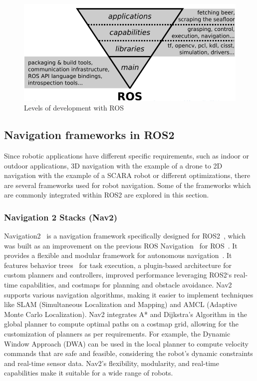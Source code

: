 \vspace{1.0em}
\begin{figure}[H]
    \centering
    \includegraphics[width=4.8in ]{pics/ree.png}
    \caption[Levels of development with ROS]{Levels of development with ROS~\cite{mosenlechner2012ros}}\label{lt_4}
\end{figure}


\newpage

\subsection{Navigation frameworks in ROS2}
Since robotic applications have different specific requirements, such as indoor or outdoor applications, 3D navigation
with the example of a drone to 2D navigation with the example of a SCARA robot or different optimizations, there are
several frameworks used for robot navigation. Some of the frameworks which are commonly integrated within ROS2 are
explored in this section. 

\subsubsection{Navigation 2 Stacks (Nav2)}
Navigation2~\cite{thomas2014nextgenros}\cite{macenski2020marathon2} is a navigation framework specifically designed for ROS2~\cite{thomas2014nextgenros}, which was built as an improvement on
the previous ROS Navigation~\cite{quigley2009ros} for ROS~\cite{mardereppstein2010office}. It provides a flexible and modular framework for autonomous
navigation~\cite{macenski2020marathon2}. It features behavior trees~\cite{abiyev2016robot} for task execution, a plugin-based architecture
for custom planners and controllers, improved performance leveraging ROS2`s real-time capabilities, and 
costmaps for planning and obstacle avoidance. Nav2 supports various navigation algorithms, making it easier to implement 
techniques like SLAM (Simultaneous Localization and Mapping) and AMCL (Adaptive Monte Carlo Localization). Nav2 
integrates A* and Dijkstra's Algorithm in the global planner to compute optimal paths on a costmap grid, allowing
for the customization of planners as per requirements. For example,  the Dynamic Window Approach (DWA) can
be used in the local planner to compute velocity commands that are safe and feasible, considering the robot's
dynamic constraints and real-time sensor data. Nav2’s flexibility, modularity, and real-time capabilities make
it suitable for a wide range of robots.


